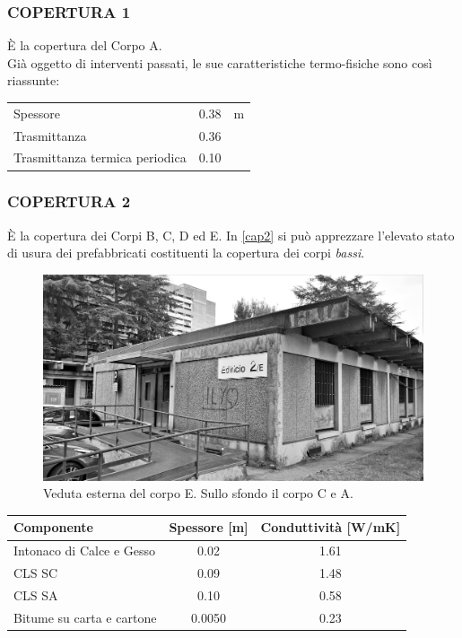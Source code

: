 \subsubsection{COPERTURA 1}
È la copertura del Corpo A.\\Già oggetto di interventi passati, le sue caratteristiche termo-fisiche sono così riassunte:
\begin{center}
	\begin{tabular}{lcc}
		\toprule
		Spessore & \num{0.38} & \si{m}\\
		Trasmittanza & \num{0.36} & \trasm\\
		Trasmittanza termica periodica & \num{0.10} & \trasm\\
		\bottomrule
	\end{tabular}
\end{center}
\subsubsection{COPERTURA 2}
È la copertura dei Corpi B, C, D ed E. In \vref{cap2} si può apprezzare l'elevato stato di usura dei prefabbricati costituenti la copertura dei corpi \emph{bassi}.
\begin{figure}[h]
	\centering
	\includegraphics[width=\textwidth]{6_2_cap/img/cop2}
	\caption[Veduta esterna del corpo E]{Veduta esterna del corpo E. Sullo sfondo il corpo C e A.}\label{cap2}
\end{figure}
\begin{center}
	\begin{tabular}{lcc}
		\toprule
		Componente & Spessore [m] & Conduttività [\si{W/mK}] \\
		\midrule
		Intonaco di Calce e Gesso & \num{0.02} & \num{1.61} \\
		CLS SC  & \num{0.09} & \num{1.48}\\
		CLS SA & \num{0.10} & \num{0.58} \\
		Bitume su carta e cartone & \num{0.0050} & \num{0.23} \\
		\bottomrule
	\end{tabular}
\end{center}
